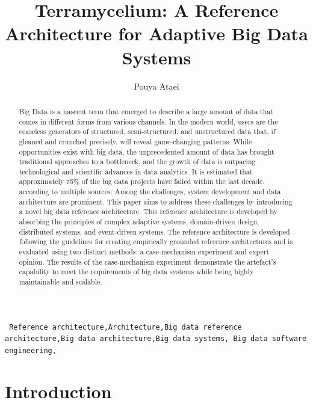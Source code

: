 \documentclass[preprint,12pt]{elsarticle}
\begin{document}
\begin{frontmatter}

\title{Terramycelium: A Reference Architecture for Adaptive Big Data Systems}

\author{Pouya Ataei}

\address[mymainaddress]{School of Engineering, Computer and Mathematical Sciences, Auckland University of Technology, Auckland, New Zealand}


\begin{abstract}
    Big Data is a nascent term that emerged to describe a large amount of data that comes in different forms from various channels. In the modern world, users are the ceaseless generators of structured, semi-structured, and unstructured data that, if gleaned and crunched precisely, will reveal game-changing patterns. While opportunities exist with big data, the unprecedented amount of data has brought traditional approaches to a bottleneck, and the growth of data is outpacing technological and scientific advances in data analytics. It is estimated that approximately 75\% of the big data projects have failed within the last decade, according to multiple sources. Among the challenges, system development and data architecture are prominent. This paper aims to address these challenges by introducing a novel big data reference architecture. This reference architecture is developed by absorbing the principles of complex adaptive systems, domain-driven design, distributed systems, and event-driven systems. The reference architecture is developed following the guidelines for creating empirically grounded reference architectures and is evaluated using two distinct methods: a case-mechanism experiment and expert opinion. The results of the case-mechanism experiment demonstrate the artefact's capability to meet the requirements of big data systems while being highly maintainable and scalable.
\end{abstract}

\begin{keyword}
\texttt{ Reference architecture\sep Architecture\sep Big data
reference architecture\sep Big data architecture\sep Big data systems\sep
Big data software engineering\sep}
\end{keyword}

\end{frontmatter}

\linenumbers

\section{Introduction}
\end{document}
